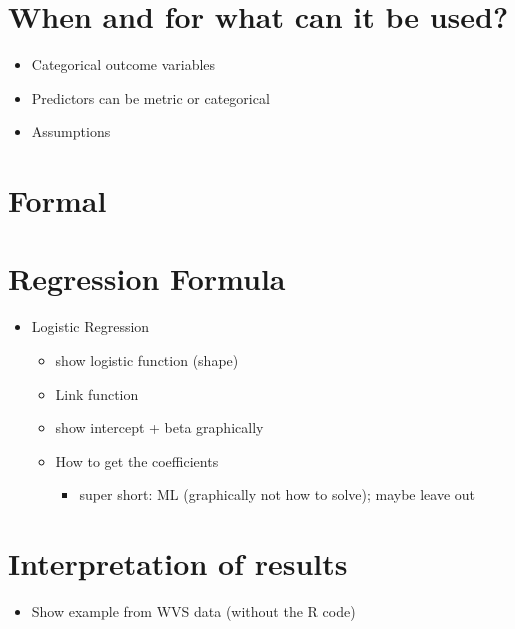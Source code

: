 \documentclass[
]{book}
\providecommand{\tightlist}{%
  \setlength{\itemsep}{0pt}\setlength{\parskip}{0pt}}
\begin{document}
\hypertarget{when-and-for-what-can-it-be-used-1}{%
\section{When and for what can it be used?}\label{when-and-for-what-can-it-be-used-1}}

\begin{itemize}
\item
  Categorical outcome variables
\item
  Predictors can be metric or categorical
\item
  Assumptions
\end{itemize}

\hypertarget{formal-1}{%
\section{Formal}\label{formal-1}}

\hypertarget{regression-formula-1}{%
\section{Regression Formula}\label{regression-formula-1}}

\begin{itemize}
\tightlist
\item
  Logistic Regression

  \begin{itemize}
  \tightlist
  \item
    show logistic function (shape)
  \item
    Link function
  \item
    show intercept + beta graphically
  \item
    How to get the coefficients

    \begin{itemize}
    \tightlist
    \item
      super short: ML (graphically not how to solve); maybe leave out
    \end{itemize}
  \end{itemize}
\end{itemize}

\hypertarget{interpretation-of-results-1}{%
\section{Interpretation of results}\label{interpretation-of-results-1}}

\begin{itemize}
\tightlist
\item
  Show example from WVS data (without the R code)
\end{itemize}
\end{document}
